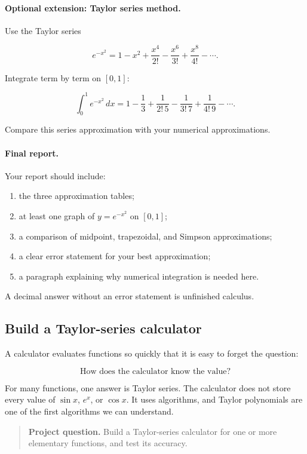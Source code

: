 \paragraph{Optional extension: Taylor series method.}
Use the Taylor series

\[
e^{-x^2}
=
1-x^2+\frac{x^4}{2!}-\frac{x^6}{3!}
+\frac{x^8}{4!}-\cdots.
\]

Integrate term by term on \([0,1]\):

\[
\int_0^1 e^{-x^2}\,dx
=
1-\frac13+\frac{1}{2!\,5}
-\frac{1}{3!\,7}
+\frac{1}{4!\,9}
-\cdots.
\]

Compare this series approximation with your numerical approximations.

\paragraph{Final report.}
Your report should include:

\begin{enumerate}
\item the three approximation tables;
\item at least one graph of \(y=e^{-x^2}\) on \([0,1]\);
\item a comparison of midpoint, trapezoidal, and Simpson approximations;
\item a clear error statement for your best approximation;
\item a paragraph explaining why numerical integration is needed here.
\end{enumerate}

A decimal answer without an error statement is unfinished calculus.

\subsection{Build a Taylor-series calculator}
\label{subsec:project-taylor-series-calculator}

A calculator evaluates functions so quickly that it is easy to forget the question:

\[
\text{How does the calculator know the value?}
\]

For many functions, one answer is Taylor series.  The calculator does not store every
value of \(\sin x\), \(e^x\), or \(\cos x\).  It uses algorithms, and Taylor polynomials are
one of the first algorithms we can understand.

\begin{quote}
\textbf{Project question.}
Build a Taylor-series calculator for one or more elementary functions, and test its
accuracy.
\end{quote}

